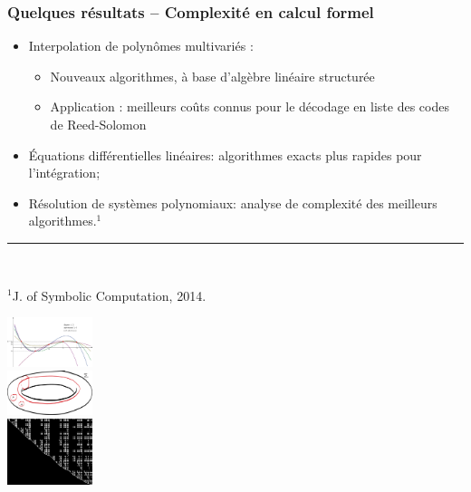 \documentclass[mathsans]{beamer}
\begin{document}
\begin{frame}
\frametitle{Quelques résultats -- Complexité en calcul formel}

\begin{minipage}{9cm}
\begin{itemize}
\item \alert{Interpolation de polynômes multivariés} :
\begin{itemize}
\item Nouveaux algorithmes, à base d'algèbre linéaire structurée
\item Application : meilleurs coûts connus pour le décodage en liste des codes de Reed-Solomon
\end{itemize}
\item \alert{Équations différentielles linéaires:} algorithmes exacts plus rapides pour l'intégration;

\item \alert{Résolution de systèmes polynomiaux}: analyse de complexité des meilleurs algorithmes.{\footnotesize$^1$}
\end{itemize}
\hrule~\\
\begin{footnotesize}{$^1$J. of Symbolic Computation, 2014.}\end{footnotesize}
\end{minipage}
\begin{minipage}{2.5cm}
\includegraphics[width=2.5cm]{Figures/interpolation_neiger.pdf}\\[0.5cm]
\includegraphics[width=2.5cm]{Figures/tore-cycles.pdf}\\[0.5cm]
\includegraphics[width=2.5cm]{Figures/mat8.jpg}
\end{minipage}

\end{frame}

\end{document}
